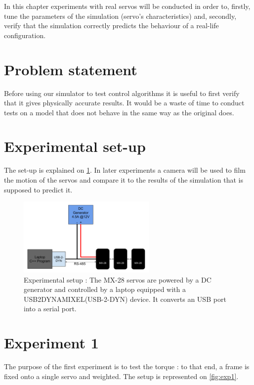 In this chapter experiments with real servos will be conducted in order to, firstly, tune the parameters of the simulation (servo's characteristics) and, secondly, verify that the simulation correctly predicts the behaviour of a real-life configuration.

\section{Problem statement}
Before using our simulator to test control algorithms it is useful to first verify that it gives physically accurate results. It would be a waste of time to conduct tests on a model that does not behave in the same way as the original does.

\section{Experimental set-up}
The set-up is explained on \cref{fig:exp_setup}. In later experiments a camera will be used to film the motion of the servos and compare it to the results of the simulation that is supposed to predict it.

\begin{figure}[htp]
\center
\includegraphics[width=0.6\textwidth]{figures/exp_setup}
\caption[Experimental setup]{Experimental setup : The MX-28 servos are powered by a DC generator and controlled by a laptop equipped with a USB2DYNAMIXEL(USB-2-DYN) device. It converts an USB port into a serial port.}
\label{fig:exp_setup}
\end{figure}

\section{Experiment 1 \label{sec:exp1}}
The purpose of the first experiment is to test the torque : to that end, a frame is fixed onto a single servo and weighted. The setup is represented on \cref{fig:exp1}.

